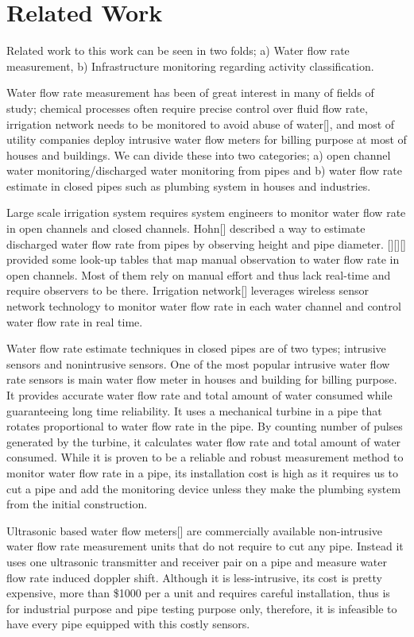 \section{Related Work}
Related work to this work can be seen in two folds; a) Water flow rate measurement, b) Infrastructure monitoring regarding activity classification.

Water flow rate measurement has been of great interest in many of fields of study; chemical processes often require precise control over fluid flow rate, irrigation network needs to be monitored to avoid abuse of water[], and most of utility companies deploy intrusive water flow meters for billing purpose at most of houses and buildings. We can divide these into two categories; a) open channel water monitoring/discharged water monitoring from pipes and b) water flow rate estimate in closed pipes such as plumbing system in houses and industries.  

Large scale irrigation system requires system engineers to monitor water flow rate in open channels and closed channels. Hohn[] described a way to estimate discharged water flow rate from pipes by observing height and pipe diameter. [][][] provided some look-up tables that map manual observation to water flow rate in open channels. Most of them rely on manual effort and thus lack real-time and require observers to be there. Irrigation network[] leverages wireless sensor network technology to monitor water flow rate in each water channel and control water flow rate in real time. 

Water flow rate estimate techniques in closed pipes are of two types; intrusive sensors and nonintrusive sensors. One of the most popular intrusive water flow rate sensors is main water flow meter in houses and building for billing purpose. It provides accurate water flow rate and total amount of water consumed while guaranteeing long time reliability. It uses a mechanical turbine in a pipe that rotates proportional to water flow rate in the pipe. By counting number of pulses generated by the turbine, it calculates water flow rate and total amount of water consumed. While it is proven to be a reliable and robust measurement method to monitor water flow rate in a pipe, its installation cost is high as it requires us to cut a pipe and add the monitoring device unless they make the plumbing system from the initial construction. 

Ultrasonic based water flow meters[] are commercially available non-intrusive water flow rate measurement units that do not require to cut any pipe. Instead it uses one ultrasonic transmitter and receiver pair on a pipe and measure water flow rate induced doppler shift. Although it is less-intrusive, its cost is pretty expensive, more than \$1000 per a unit and requires careful installation, thus is for industrial purpose and pipe testing purpose only, therefore, it is infeasible to have every pipe equipped with this costly sensors.

